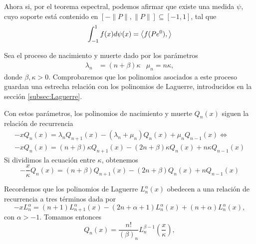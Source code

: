     Ahora si, por el teorema espectral, podemos afirmar que existe una medida $\psi$, cuyo soporte está contenido en $[-\|P\|,\|P\|]\subseteq[-1,1]$, tal que 
    \begin{equation}
        \int_{-1}^1 f(x)d\psi(x) = \left\langle f(Pe^{0}) ,  \right\rangle
    \end{equation}


\begin{ejemplo}
    Sea el proceso de nacimiento y muerte dado por los parámetros
    \begin{align*}
        \lambda_n &=(n+\beta)\kappa & \mu_n = n\kappa, 
    \end{align*}
    donde $\beta,\kappa > 0$. Comprobaremos que los polinomios asociados a este proceso guardan una estrecha relación con los polinomios de Laguerre, introducidos en la sección \ref{subsec:Laguerre}.

    Con estos parámetros, los polinomios de nacimiento y muerte $Q_n(x)$ siguen la relación de recurrencia
    \begin{equation*}
        \begin{array}{c}
            -xQ_n(x) = \lambda_n Q_{n+1}(x) - (\lambda_n+\mu_n)Q_n(x) +\mu_n Q_{n-1}(x) \Leftrightarrow \\
            -x Q_n(x) = (n+\beta)\kappa Q_{n+1}(x) -(2n+\beta)\kappa Q_n(x) + n\kappa Q_{n-1}(x)
        \end{array}
    \end{equation*}
    Si dividimos la ecuación entre $\kappa$, obtenemos
    \begin{equation}
        \label{eq:ejemplo-laguerre1}
        -\frac{x}{\kappa} Q_n(x) = (n+\beta)Q_{n+1}(x) -(2n+\beta)Q_n(x) + n Q_{n-1}(x)
    \end{equation}
    

    Recordemos que los polinomios de Laguerre $L_n^\alpha(x)$ obedecen a una relación de recurrencia a tres términos dada por
    \begin{equation}
        \label{eq:ejemplo-laguerre2}
        -x L_n^\alpha = (n+1) L_{n+1}^\alpha(x) - (2n+\alpha+1)L_n^\alpha(x) + (n+\alpha)L_n^\alpha(x),
    \end{equation}
    con $\alpha > -1$. Tomamos entonces 
    \begin{equation}
        \label{eq:polinomiosQejemplo}
        Q_n(x) = \dfrac{n!}{(\beta)_n} L_n^{\beta-1}\left(\frac x \kappa\right),    
    \end{equation}
    

\end{ejemplo}
